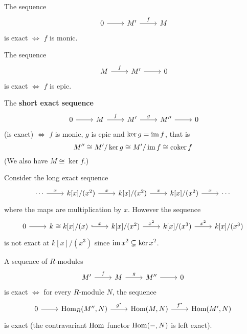 \begin{exam}
	\begin{enum}
		\io The sequence
		\[\
		\begin{tikzcd}
			0 \ar[r] & M' \ar[r, "f"] & M
		\end{tikzcd}
		\]
		is exact $\iff$ $f$ is monic.
		
		\io The sequence
		\[\
		\begin{tikzcd}
			M \ar[r, "f"] & M' \ar[r] & 0
		\end{tikzcd}
		\]
		is exact $\iff$ $f$ is epic.
		
		\io The \textbf{short exact sequence}
		\[\
		\begin{tikzcd}
			0 \ar[r] & M \ar[r, "f"] & M' \ar[r, "g"] & M'' \ar[r] & 0
		\end{tikzcd}
		\]
		(is exact) $\iff$ $f$ is monic, $g$ is epic and $\ker g = \operatorname{im} f$, that is
		\[M'' \cong M'/\ker g \cong M'/\operatorname{im} f \cong \operatorname{coker} f\]
		(We also have $M \cong \ker f$.)
		
		\io Consider the long exact sequence
		\[
		\begin{tikzcd}
			\cdots \ar[r, "x"] & k[x]/(x^2) \ar[r, "x"] & k[x]/(x^2) \ar[r, "x"] & k[x]/(x^2) \ar[r, "x"] & \cdots
		\end{tikzcd}
		\]
		where the maps are multiplication by $x$.
		However the sequence
		\[
		\begin{tikzcd}
			0 \ar[r] & k \cong k[x]/(x) \ar[r, hookrightarrow, "x"] & k[x]/(x^2) \ar[r, "x^2"] & k[x]/(x^3) \ar[r, "x^2"] & k[x]/(x^3)
		\end{tikzcd}
		\]
		is not exact at $k[x]/(x^3)$ since $\operatorname{im} x^2 \subsetneq \ker x^2$.
	\end{enum}
\end{exam}

\begin{prop}
	A sequence of $R$-modules
	\[
	\begin{tikzcd}
		M' \ar[r, "f"] & M \ar[r, "g"] & M'' \ar[r] & 0
	\end{tikzcd}
	\]
	is exact $\iff$ for every $R$-module $N$, the sequence
	\[
	\begin{tikzcd}
	0 \ar[r] & \Hom_R(M'',N) \ar[r, "g^*"] & \Hom(M,N) \ar[r, "f^*"] & \Hom(M',N)
	\end{tikzcd}
	\]
	is exact (the contravariant $\operatorname{Hom}$ functor $\operatorname{Hom}(-,N)$ is left exact).
\end{prop}